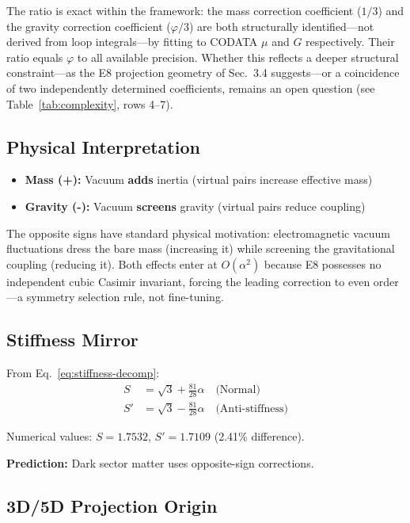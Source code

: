 \documentclass[aps,prd,twocolumn,superscriptaddress,floatfix,nofootinbib]{revtex4-2}
\theoremstyle{definition}
\theoremstyle{remark}
\newcommand{\vp}{\varphi}
\begin{document}
The ratio is exact within the framework: the mass correction coefficient ($1/3$) and the gravity correction coefficient ($\vp/3$) are both structurally identified---not derived from loop integrals---by fitting to CODATA $\mu$ and $G$ respectively. Their ratio equals $\vp$ to all available precision. Whether this reflects a deeper structural constraint---as the E8 projection geometry of Sec.~3.4 suggests---or a coincidence of two independently determined coefficients, remains an open question (see Table~\ref{tab:complexity}, rows 4--7).

\subsection{Physical Interpretation}

\begin{itemize}
\item \textbf{Mass (+):} Vacuum \textbf{adds} inertia (virtual pairs increase effective mass)
\item \textbf{Gravity (-):} Vacuum \textbf{screens} gravity (virtual pairs reduce coupling)
\end{itemize}

\noindent The opposite signs have standard physical motivation: electromagnetic vacuum fluctuations dress the bare mass (increasing it) while screening the gravitational coupling (reducing it). Both effects enter at $O(\alpha^2)$ because E8 possesses no independent cubic Casimir invariant, forcing the leading correction to even order---a symmetry selection rule, not fine-tuning.

\subsection{Stiffness Mirror}

From Eq.~\eqref{eq:stiffness-decomp}:
\begin{align}
S &= \sqrt{3} + \frac{81}{28}\alpha \quad \text{(Normal)} \\
S' &= \sqrt{3} - \frac{81}{28}\alpha \quad \text{(Anti-stiffness)}
\end{align}

Numerical values: $S = 1.7532$, $S' = 1.7109$ (2.41\% difference).

\textbf{Prediction:} Dark sector matter uses opposite-sign corrections.

\subsection{3D/5D Projection Origin}
\end{document}
